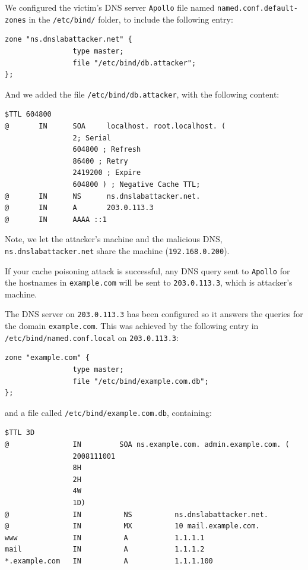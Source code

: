 We configured the victim's DNS server {\tt Apollo}
file named {\tt named.conf.default-zones} in
the {\tt /etc/bind/} folder, to include the following entry:

\begin{verbatim}
zone "ns.dnslabattacker.net" {
                type master;
                file "/etc/bind/db.attacker";
};
\end{verbatim}

And we added the file {\tt /etc/bind/db.attacker}, with the following
content:

\begin{verbatim}
$TTL 604800
@		IN		SOA		localhost. root.localhost. (
                2; Serial
                604800 ; Refresh
                86400 ; Retry
                2419200 ; Expire
                604800 ) ; Negative Cache TTL;
@		IN		NS		ns.dnslabattacker.net.
@		IN		A		203.0.113.3
@		IN		AAAA ::1
\end{verbatim}
\noindent Note, we let the attacker's machine and the malicious DNS, 
{\tt ns.dnslabattacker.net} share the machine ({\tt 192.168.0.200}). 

If your cache poisoning attack is successful, any 
DNS query sent to {\tt Apollo} for the hostnames 
in {\tt example.com} will be sent to {\tt 203.0.113.3}, which is 
attacker's machine. 


The DNS server on {\tt 203.0.113.3} has been configured so it answers the 
queries for the domain {\tt example.com}.  This was achieved by
the following 
entry in {\tt /etc/bind/named.conf.local} on {\tt 203.0.113.3}:

\begin{verbatim}
zone "example.com" {
                type master;
                file "/etc/bind/example.com.db";
};
\end{verbatim}

\noindent and a file called {\tt /etc/bind/example.com.db}, containing:

\begin{verbatim}
$TTL 3D
@               IN         SOA ns.example.com. admin.example.com. (
                2008111001
                8H
                2H
                4W
                1D)	
@               IN          NS          ns.dnslabattacker.net.
@               IN          MX          10 mail.example.com.
www             IN          A           1.1.1.1	
mail            IN          A           1.1.1.2
*.example.com   IN          A           1.1.1.100
\end{verbatim}

